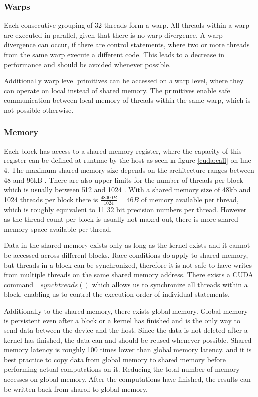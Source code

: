 \documentclass[]{article}
\begin{document}
\subsubsection{Warps}

Each consecutive grouping of 32 threads form a warp. All threads within a warp are executed in parallel, given that there is no warp divergence. A warp divergence can occur, if there are control statements, where two or more threads from the same warp execute a different code. This leads to a decrease in performance and should be avoided whenever possible. \cite{warps}

Additionally warp level primitives can be accessed on a warp level, where they can operate on local instead of shared memory. The primitives enable safe communication between local memory of threads within the same warp, which is not possible otherwise. \cite{CUDAGuide} \cite{warps}

\subsubsection{Memory}

Each block has access to a shared memory register, where the capacity of this register can be defined at runtime by the host as seen in figure \ref{cuda:call} on line 4. The maximum shared memory size depends on the architecture ranges between 48 and 96kB \cite{CUDAGuide}. There are also upper limits for the number of threads per block which is usually between 512 and 1024 \cite{CUDAGuide}. With a shared memory size of 48kb and 1024 threads per block there is $\frac{48000B}{1024} = 46B$ of memory available per thread, which is roughly equivalent to 11 32 bit precision numbers per thread. However as the thread count per block is usually not maxed out, there is more shared memory space available per thread. 

Data in the shared memory exists only as long as the kernel exists and it cannot be accessed across different blocks. Race conditions do apply to shared memory, but threads in a block can be synchronized, therefore it is not safe to have writes from multiple threads on the same shared memory address. There exists a CUDA command $\_\_synchtreads()$ which allows us to synchronize all threads within a block, enabling us to control the execution order of individual statements.

Additionally to the shared memory, there exists global memory. Global memory is persistent even after a block or a kernel has finished and is the only way to send data between the device and the host. Since the data is not deleted after a kernel has finished, the data can and should be reused whenever possible. Shared memory latency is roughly 100 times lower than global memory latency. \cite{sharedMem} and it is best practice to copy data from global memory to shared memory before performing actual computations on it. Reducing the total number of memory accesses on global memory. After the computations have finished, the results can be written back from shared to global memory. \cite{gMem}
\end{document}
